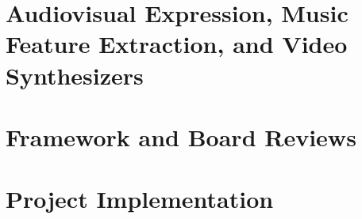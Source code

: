 \documentclass{report}
\begin{document}
\chapter{Audiovisual Expression, Music Feature Extraction, and Video Synthesizers}




\chapter{Framework and Board Reviews}



\chapter{Project Implementation}



\printbibliography

\begin{appendices}
  
\end{appendices}
\end{document}
